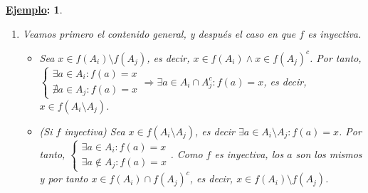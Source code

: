 \documentclass[10pt,a4paper,openright]{book}
\theoremstyle{break}
\newtheorem*{ej}{\underline{Ejemplo}:}
\begin{document}
\begin{ej}
\begin{enumerate}[label={(\arabic*)}]
\begin{enumerate}[label={(\alph*)}]
\begin{itemize}
 \item (Si $f$ inyectiva) Sea $x \in \bigcap_i f( A_i)$. Entonces, $\forall i \in I : x \in f(A_i)$. Entonces, $\forall i \in I \ \exists a \in A_i : f(a) = x \Rightarrow \exists a \in \bigcap_i A_i : f(a) = x$, y como la $f$ es inyectiva, $x \in f(\bigcap_i A_i)$.
 \end{itemize}
 \item  Veamos primero el contenido general, y después el caso en que $f$ es inyectiva.
 \begin{itemize}
 \item Sea $x \in f(A_i) \setminus f(A_j)$, es decir, $x \in f(A_i) \wedge x \in f(A_j)^c$. Por tanto, $\begin{cases} \exists a \in A_i : f(a) = x \\ \nexists a \in A_j : f(a) = x  \end{cases}\Rightarrow \exists a \in A_i \cap A_j^c : f(a) = x$, es decir, $x \in f(A_i \setminus A_j)$.
 \item (Si $f$ inyectiva) Sea $x \in f(A_i \setminus A_j)$, es decir $\exists a \in A_i \setminus A_j : f(a)=x$. Por tanto, $\begin{cases} \exists a \in A_i : f(a) = x \\ \exists a \notin A_j : f(a) = x  \end{cases}$. Como $f$ es inyectiva, los $a$ son los mismos y por tanto $x \in f(A_i) \cap f(A_j)^c$, es decir, $x \in f(A_i) \setminus f(A_j)$.
 \end{itemize}
 \end{enumerate}
\end{enumerate}
\end{ej}
\end{document}
